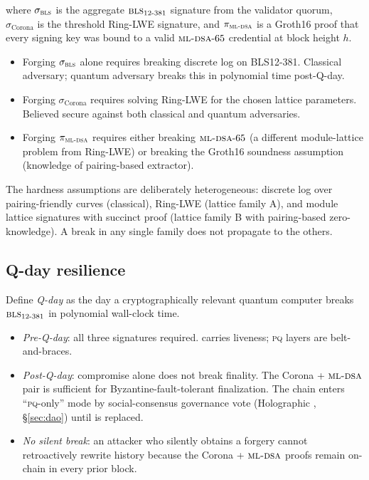\noindent where $\sigma_{\textsc{bls}{}}$ is the aggregate $\textsc{bls}{}_{12\text{-}381}$
signature from the validator quorum, $\sigma_{\text{Corona}}$ is the
threshold Ring-LWE signature, and $\pi_{\textsc{ml-dsa}{}}$ is a Groth16 proof
that every signing key was bound to a valid $\textsc{ml-dsa}{}\text{-}65$
credential at block height $h$.

\begin{itemize}[nosep,leftmargin=1.2em]
\item Forging $\sigma_{\textsc{bls}{}}$ alone requires breaking discrete log on
  BLS12-381. Classical adversary; quantum adversary breaks this in
  polynomial time post-Q-day.
\item Forging $\sigma_{\text{Corona}}$ requires solving Ring-LWE for
  the chosen lattice parameters. Believed secure against both
  classical and quantum adversaries.
\item Forging $\pi_{\textsc{ml-dsa}{}}$ requires either breaking
  $\textsc{ml-dsa}{}\text{-}65$ (a different module-lattice problem from
  Ring-LWE) or breaking the Groth16 soundness assumption (knowledge
  of pairing-based extractor).
\end{itemize}

The hardness assumptions are deliberately heterogeneous: discrete log
over pairing-friendly curves (classical), Ring-LWE (lattice family A),
and module lattice signatures with succinct proof (lattice family B
with pairing-based zero-knowledge). A break in any single family does
not propagate to the others.

\subsection{Q-day resilience}

Define \emph{Q-day} as the day a cryptographically relevant quantum
computer breaks $\textsc{bls}{}_{12\text{-}381}$ in polynomial wall-clock time.

\begin{itemize}[nosep,leftmargin=1.2em]
\item \emph{Pre-Q-day}: all three signatures required. \BLS{} carries
  liveness; \textsc{pq} layers are belt-and-braces.
\item \emph{Post-Q-day}: \BLS{} compromise alone does not break
  finality. The Corona + $\textsc{ml-dsa}{}$ pair is sufficient for
  Byzantine-fault-tolerant finalization. The chain enters
  ``\textsc{pq}-only'' mode by social-consensus governance vote
  (Holographic \DAO{}, \S\ref{sec:dao}) until \BLS{} is replaced.
\item \emph{No silent break}: an attacker who silently obtains a
  \BLS{} forgery cannot retroactively rewrite history because the
  Corona + $\textsc{ml-dsa}{}$ proofs remain on-chain in every prior block.
\end{itemize}

